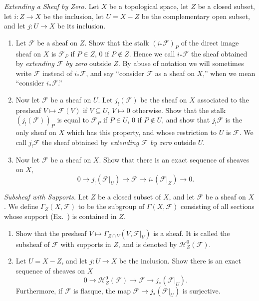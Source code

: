 {\begin{description}[leftmargin=2.4em,labelindent=0pt,topsep=3pt,itemsep=5pt,parsep=0pt]
\item[\hypertarget{ex-II-1.19}{}\textbf{1.19.}] \emph{Extending a Sheaf by Zero.} Let $X$ be a topological space, let $Z$ be a closed subset, let $i\colon Z\to X$ be the inclusion, let $U=X-Z$ be the complementary open subset, and let $j\colon U\to X$ be its inclusion.
\begin{enumerate}[label=(\alph*),leftmargin=1.55em,nosep]
\item Let $\mathcal F$ be a sheaf on $Z$. Show that the stalk $(i_*\mathcal F)_P$ of the direct image sheaf on $X$ is $\mathcal F_P$ if $P\in Z$, $0$ if $P\notin Z$. Hence we call $i_*\mathcal F$ the sheaf obtained by \emph{extending $\mathcal F$ by zero} outside $Z$. By abuse of notation we will sometimes write $\mathcal F$ instead of $i_*\mathcal F$, and say \textquotedblleft{}consider $\mathcal F$ as a sheaf on $X$,\textquotedblright{} when we mean \textquotedblleft{}consider $i_*\mathcal F$.\textquotedblright{}
\item Now let $\mathcal F$ be a sheaf on $U$. Let $j_!(\mathcal F)$ be the sheaf on $X$ associated to the presheaf $V\mapsto\mathcal F(V)$ if $V\subseteq U$, $V\mapsto0$ otherwise. Show that the stalk $(j_!(\mathcal F))_P$ is equal to $\mathcal F_P$ if $P\in U$, $0$ if $P\notin U$, and show that $j_!\mathcal F$ is the only sheaf on $X$ which has this property, and whose restriction to $U$ is $\mathcal F$. We call $j_!\mathcal F$ the sheaf obtained by \emph{extending $\mathcal F$ by zero} outside $U$.
\item Now let $\mathcal F$ be a sheaf on $X$. Show that there is an exact sequence of sheaves on $X$,
\[
0\to j_!(\mathcal F|_U)\to\mathcal F\to i_*(\mathcal F|_Z)\to0.
\]
\end{enumerate}

\item[\hypertarget{ex-II-1.20}{}\textbf{1.20.}] \emph{Subsheaf with Supports.} Let $Z$ be a closed subset of $X$, and let $\mathcal F$ be a sheaf on $X$. We define $\Gamma_Z(X,\mathcal F)$ to be the subgroup of $\Gamma(X,\mathcal F)$ consisting of all sections whose support (Ex.~) is contained in $Z$.
\begin{enumerate}[label=(\alph*),leftmargin=1.55em,nosep]
\item Show that the presheaf $V\mapsto\Gamma_{Z\cap V}(V,\mathcal F|_V)$ is a sheaf. It is called the subsheaf of $\mathcal F$ with supports in $Z$, and is denoted by $\mathcal H_Z^0(\mathcal F)$.
\item Let $U=X-Z$, and let $j\colon U\to X$ be the inclusion. Show there is an exact sequence of sheaves on $X$
\[
0\to\mathcal H_Z^0(\mathcal F)\to\mathcal F\to j_*(\mathcal F|_U).
\]
Furthermore, if $\mathcal F$ is flasque, the map $\mathcal F\to j_*(\mathcal F|_U)$ is surjective.
\end{enumerate}


\end{description}}
